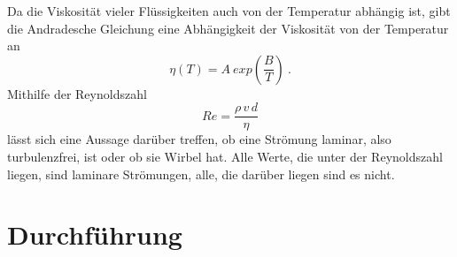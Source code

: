 Da die Viskosität vieler Flüssigkeiten auch von der Temperatur abhängig ist, gibt die
Andradesche Gleichung eine Abhängigkeit der Viskosität von der Temperatur an
\begin{equation}
  \eta(T) = A \ exp\left(\frac{B}{T}\right) \ .
  \label{eqn:5}
\end{equation}
Mithilfe der Reynoldszahl\cite[99]{geschke}
\begin{equation}
  Re = \frac{\rho \, v \, d}{\eta}
  \label{eqn:6}
\end{equation}
lässt sich eine Aussage darüber treffen, ob eine Strömung laminar, also turbulenzfrei,
ist oder ob sie Wirbel hat. Alle Werte, die unter der Reynoldszahl liegen, sind laminare
Strömungen, alle, die darüber liegen sind es nicht.

\section{Durchführung}
